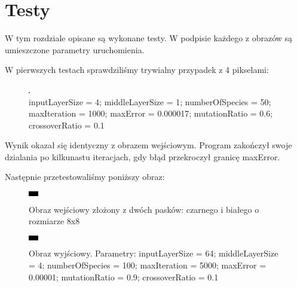 \documentclass[12pt,a4paper,oneside]{article}
\begin{document}
\section{Testy}
W tym rozdziale opisane są wykonane testy. W podpisie każdego z obrazów są umieszczone parametry uruchomienia.

W pierwszych testach sprawdziliśmy trywialny przypadek z 4 pikselami:
\begin{figure}[h]
\centering
\includegraphics[width=.3\textwidth]{4x4}
\caption{inputLayerSize = 4; middleLayerSize = 1; numberOfSpecies = 50; maxIteration = 1000; maxError = 0.000017; mutationRatio = 0.6; crossoverRatio = 0.1}
\end{figure}
Wynik okazał się identyczny z obrazem wejściowym. Program zakończył swoje dzialania po kilkunastu iteracjach, gdy błąd przekroczył granicę maxError.

Następnie przetestowaliśmy poniższy obraz:

\begin{figure}[h]
\centering
\includegraphics[width=.3\textwidth]{gray2s}
\caption{Obraz wejściowy złożony z dwóch pasków: czarnego i białego o rozmiarze 8x8}
\end{figure}

\begin{figure}[H]
\centering
\includegraphics[width=.3\textwidth]{gray2s-o}
\caption{Obraz wyjściowy. Parametry: inputLayerSize = 64; middleLayerSize = 4; numberOfSpecies = 100; maxIteration = 5000; maxError = 0.00001; mutationRatio = 0.9; crossoverRatio = 0.1}
\end{figure}
\end{document}
